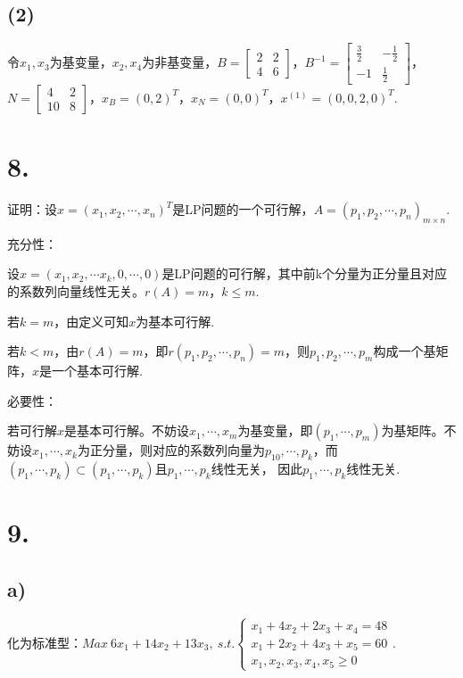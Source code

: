 \documentclass{article}
\begin{document}
	\subsection*{(2)}
	
	令$x_1, x_3$为基变量，$x_2, x_4$为非基变量，$B=\begin{bmatrix} 2 & 2 \\ 4 & 6\end{bmatrix}$，$B^{-1}=\begin{bmatrix} \frac{3}{2} & -\frac{1}{2} \\ -1 & \frac{1}{2}\end{bmatrix}$，$N=\begin{bmatrix} 4 & 2 \\ 10 & 8\end{bmatrix}$，$x_B=(0,2)^T$，$x_N=(0,0)^T$，$x^{(1)}=(0,0,2,0)^T$.
	
	\section*{8.}
	
	证明：设$x=(x_1, x_2, \cdots, x_n)^T$是LP问题的一个可行解，$A=(p_1, p_2,\cdots,p_n)_{m\times n}$.
	
    充分性：
	
	设$x=(x_1,x_2,\cdots x_k, 0,\cdots,0)$是LP问题的可行解，其中前k个分量为正分量且对应的系数列向量线性无关。$r(A)=m$，$k\leq m$.
	
	若$k=m$，由定义可知$x$为基本可行解.
	
	若$k<m$，由$r(A)=m$，即$r(p_1, p_2,\cdots,p_n)=m$，则$p_1, p_2,\cdots,p_m$构成一个基矩阵，$x$是一个基本可行解.
	
	必要性：

	若可行解$x$是基本可行解。不妨设$x
	_1, \cdots, x_m$为基变量，即$(p_1,\cdots,p_m)$为基矩阵。不妨设$x_1, \cdots,x_k$为正分量，则对应的系数列向量为$p_10,\cdots,p_k$，而$(p_1,\cdots,p_k)\subset (p_1,\cdots,p_k)$且$p_1,\cdots,p_k$线性无关， 因此$p_1,\cdots,p_k$线性无关.
	
	\section*{9.}
	\subsection*{a)}
	
	化为标准型：$Max\ 6x_1+14x_2+13x_3,\ s.t. \begin{cases}
		x_1+4x_2+2x_3+x_4=48\\
		x_1+2x_2+4x_3+x_5=60\\
		x_1, x_2, x_3, x_4, x_5 \geq 0
	\end{cases} $.
	
\end{document}
